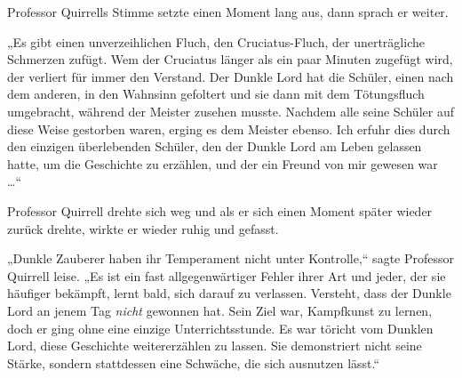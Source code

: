 Professor Quirrells Stimme setzte einen Moment lang aus, dann sprach er weiter.

„Es gibt einen unverzeihlichen Fluch, den Cruciatus-Fluch, der unerträgliche Schmerzen zufügt. Wem der Cruciatus länger als ein paar Minuten zugefügt wird, der verliert für immer den Verstand. Der Dunkle Lord hat die Schüler, einen nach dem anderen, in den Wahnsinn gefoltert und sie dann mit dem Tötungsfluch umgebracht, während der Meister zusehen musste. Nachdem alle seine Schüler auf diese Weise gestorben waren, erging es dem Meister ebenso. Ich erfuhr dies durch den einzigen überlebenden Schüler, den der Dunkle Lord am Leben gelassen hatte, um die Geschichte zu erzählen, und der ein Freund von mir gewesen war …“

Professor Quirrell drehte sich weg und als er sich einen Moment später wieder zurück drehte, wirkte er wieder ruhig und gefasst.

„Dunkle Zauberer haben ihr Temperament nicht unter Kontrolle,“ sagte Professor Quirrell leise. „Es ist ein fast allgegenwärtiger Fehler ihrer Art und jeder, der sie häufiger bekämpft, lernt bald, sich darauf zu verlassen. Versteht, dass der Dunkle Lord an jenem Tag \emph{nicht} gewonnen hat. Sein Ziel war, Kampfkunst zu lernen, doch er ging ohne eine einzige Unterrichtsstunde. Es war töricht vom Dunklen Lord, diese Geschichte weitererzählen zu lassen. Sie demonstriert nicht seine Stärke, sondern stattdessen eine Schwäche, die sich ausnutzen lässt.“

